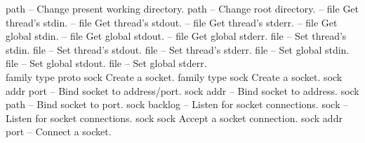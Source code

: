 \begin{longtable}{}
\hline
\optableent
	{path}
	{{\bf {}}}
	{--}
	{Change present working directory.}
\hline
\optableent
	{path}
	{{\bf {}}}
	{--}
	{Change root directory.}
\hline
\optableent
	{--}
	{{\bf {}}}
	{file}
	{Get thread's stdin.}
\hline
\optableent
	{--}
	{{\bf {}}}
	{file}
	{Get thread's stdout.}
\hline
\optableent
	{--}
	{{\bf {}}}
	{file}
	{Get thread's stderr.}
\hline
\optableent
	{--}
	{{\bf {}}}
	{file}
	{Get global stdin.}
\hline
\optableent
	{--}
	{{\bf {}}}
	{file}
	{Get global stdout.}
\hline
\optableent
	{--}
	{{\bf {}}}
	{file}
	{Get global stderr.}
\hline
\optableent
	{file}
	{{\bf {}}}
	{--}
	{Set thread's stdin.}
\hline
\optableent
	{file}
	{{\bf {}}}
	{--}
	{Set thread's stdout.}
\hline
\optableent
	{file}
	{{\bf {}}}
	{--}
	{Set thread's stderr.}
\hline
\optableent
	{file}
	{{\bf {}}}
	{--}
	{Set global stdin.}
\hline
\optableent
	{file}
	{{\bf {}}}
	{--}
	{Set global stdout.}
\hline
\optableent
	{file}
	{{\bf {}}}
	{--}
	{Set global stderr.}
\hline \hline
{} \\
\hline \hline
\optableent
	{family type proto}
	{{\bf {}}}
	{sock}
	{Create a socket.}
\optableent
	{family type}
	{{\bf {}}}
	{sock}
	{Create a socket.}
\hline
\optableent
	{sock addr port}
	{{\bf {}}}
	{--}
	{Bind socket to address/port.}
\optableent
	{sock addr}
	{{\bf {}}}
	{--}
	{Bind socket to address.}
\optableent
	{sock path}
	{{\bf {}}}
	{--}
	{Bind socket to port.}
\hline
\optableent
	{sock backlog}
	{{\bf {}}}
	{--}
	{Listen for socket connections.}
\optableent
	{sock}
	{{\bf {}}}
	{--}
	{Listen for socket connections.}
\hline
\optableent
	{sock}
	{{\bf {}}}
	{sock}
	{Accept a socket connection.}
\hline
\optableent
	{sock addr port}
	{{\bf {}}}
	{--}
	{Connect a socket.}

\end{longtable}
